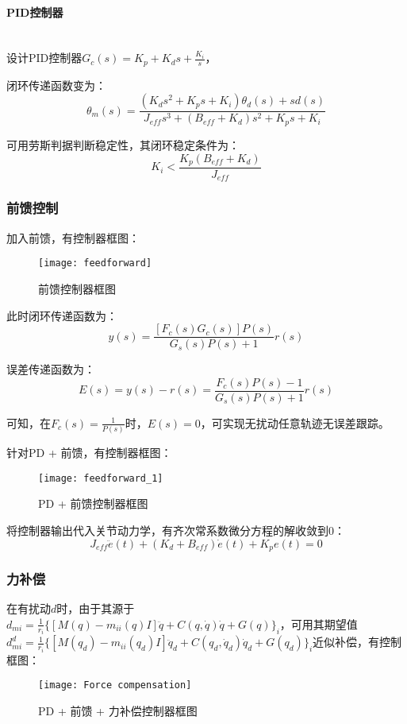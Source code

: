 \documentclass[
12pt, %
a4paper, 
oneside, %
headinclude,footinclude, %
]{scrartcl}
\begin{document}
\paragraph{PID控制器}~\\

设计PID控制器$ G_c(s) = K_p + K_d s + \frac{K_i}{s} $，

闭环传递函数变为：
$$ \theta_m(s) = \frac{(K_d s^2 + K_p s + K_i)\theta_d(s) + s d(s)}{J_{eff}s^3 + (B_{eff} + K_d)s^2 + K_p s + K_i} $$

可用劳斯判据判断稳定性，其闭环稳定条件为：
$$ K_i < \frac{K_p(B_{eff} + K_d)}{J_{eff}} $$
\subsubsection[前馈控制]{前馈控制}
加入前馈，有控制器框图：
\begin{figure}[H]
\centering 
\texttt{[image: feedforward]} 
\caption{前馈控制器框图}
\end{figure}

此时闭环传递函数为：
$$ y(s) = \frac{[F_c(s)G_c(s)]P(s)}{G_s(s)P(s) + 1}r(s) $$

误差传递函数为：
$$ E(s) = y(s) - r(s) = \frac{F_c(s)P(s) - 1}{G_s(s)P(s) + 1}r(s) $$

可知，在$ F_c(s) = \frac{1}{P(s)} $时，$ E(s) = 0 $，可实现无扰动任意轨迹无误差跟踪。

针对PD + 前馈，有控制器框图：
\begin{figure}[H]
\centering 
\texttt{[image: feedforward\_1]} 
\caption{PD + 前馈控制器框图}
\end{figure}

将控制器输出代入关节动力学，有齐次常系数微分方程的解收敛到$ 0 $：
$$ J_{eff}\ddot{e}(t) + (K_d + B_{eff})\dot{e}(t) + K_p e(t) = 0 $$
\subsubsection[力补偿]{力补偿}
在有扰动$ d $时，由于其源于$ d_{mi} = \frac{1}{r_i}\{[M(q) - m_{ii}(q)I]\ddot{q} + C(q, \dot{q})\dot{q} + G(q)\}_i $，可用其期望值$ d_{mi}^d = \frac{1}{r_i}\{[M(q_d) - m_{ii}(q_d)I]\ddot{q}_d + C(q_d, \dot{q}_d)\dot{q}_d + G(q_d)\}_i $近似补偿，有控制框图：
\begin{figure}[H]
\centering 
\texttt{[image: Force compensation]} 
\caption{PD + 前馈 + 力补偿控制器框图}
\end{figure}
\end{document}
